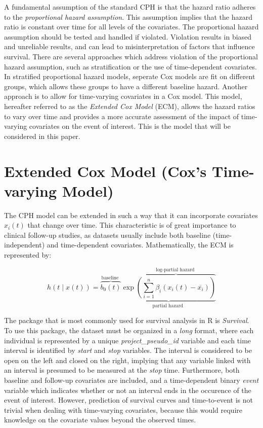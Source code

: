 A fundamental assumption of the standard CPH is that the hazard ratio adheres to the \textit{proportional hazard assumption}. This assumption implies that the hazard ratio is constant over time for all levels of the covariates. The proportional hazard assumption should be tested and handled if violated. Violation results in biased and unreliable results, and can lead to misinterpretation of factors that influence survival. There are several approaches which address violation of the proportional hazard assumption, such as stratification or the use of time-dependent covariates. In stratified proportional hazard models, seperate Cox models are fit on different groups, which allows these groups to have a different baseline hazard. Another approach is to allow for time-varying covariates in a Cox model. This model, hereafter referred to as the \textit{Extended Cox Model} (ECM), allows the hazard ratios to vary over time and provides a more accurate assessment of the impact of time-varying covariates on the event of interest.  This is the model that will be considered in this paper. 
\section{Extended Cox Model (Cox's Time-varying Model)}
\label{section:data:ecm}
The CPH model can be extended in such a way that it can incorporate covariates $x_{i}(t)$ that change over time. This characteristic is of great importance to clinical follow-up studies, as datasets usually include both baseline (time-independent) and time-dependent covariates. Mathematically, the ECM is represented by:  

$$
h(t \mid x(t))=\overbrace{b_0(t)}^{\text {baseline }} \underbrace{\exp \overbrace{\left(\sum_{i=1}^n \beta_i\left(x_i(t)-\overline{x_i}\right)\right)}^{\text {log-partial hazard }}}_{\text {partial hazard }}
$$

The package that is most commonly used for survival analysis in R is \textit{Survival}. To use this package, the dataset must be organized in a \textit{long} format, where each individual is represented by a unique \textit{project\_pseudo\_id} variable and each time interval is identified by \textit{start} and \textit{stop} variables. 
The interval is considered to be open on the left and closed on the right, implying that any variable linked with an interval is presumed to be measured at the \textit{stop} time. Furthermore, both baseline and follow-up covariates are included, and a time-dependent binary \textit{event} variable which indicates whether or not an interval ends in the occurence of the event of interest. 
However, prediction of survival curves and time-to-event is not trivial when dealing with time-varying covariates, because this would require knowledge on the covariate values beyond the observed times.  %


